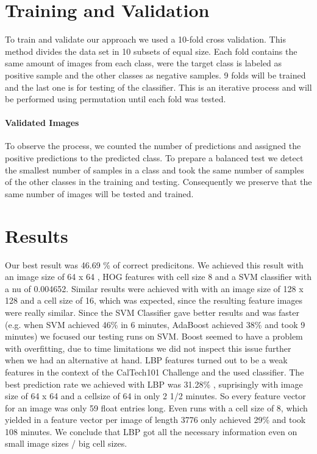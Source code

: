 \documentclass[a4paper,10pt]{article}
\begin{document}
\section{Training and Validation}
To train and validate our approach we used a 10-fold cross validation. 
This method divides the data set in 10 subsets of equal size. Each fold contains the same amount of images from each class, were the target class is labeled as positive sample and the other classes as negative samples. 9 folds will be trained and the last one is for testing of the classifier.
This is an iterative process and will be performed using permutation until each fold was tested.
\paragraph{Validated Images}
To observe the process, we counted the number of predictions and assigned the positive predictions to the predicted class.
To prepare a balanced test we detect the smallest number of samples in a class and took the same number of samples of the other classes in the training and testing. 
Consequently we preserve that the same number of images will be tested and trained.
\section{Results}
Our best result was 46.69 \% of correct predicitons.
We achieved this result with an image size of 64 x 64 , HOG features with cell size 8 and a SVM classifier with a nu of 0.004652.
Similar results were achieved with with an image size of 128 x 128 and a cell size of 16, which was expected, since the resulting feature images were really similar.
Since the SVM Classifier gave better results and was faster (e.g. when SVM achieved 46\% in 6 minutes, AdaBoost achieved 38\% and took 9 minutes) we focused our testing runs on SVM.
Boost seemed to have a problem with overfitting, due to time limitations we did not inspect this issue further when we had an alternative at hand.
LBP features turned out to be a weak features in the context of the CalTech101 Challenge and the used classifier.
The best prediction rate we achieved with LBP was 31.28\% , suprisingly with image size of 64 x 64 and a cellsize of 64 in only 2 1/2 minutes. So every feature vector for an image was only 59
float entries long. Even runs with a cell size of 8, which yielded in a feature vector per image of length 3776 only achieved 29\% and took 108 minutes.
We conclude that LBP got all the necessary information even on small image sizes / big cell sizes. 
\end{document}
